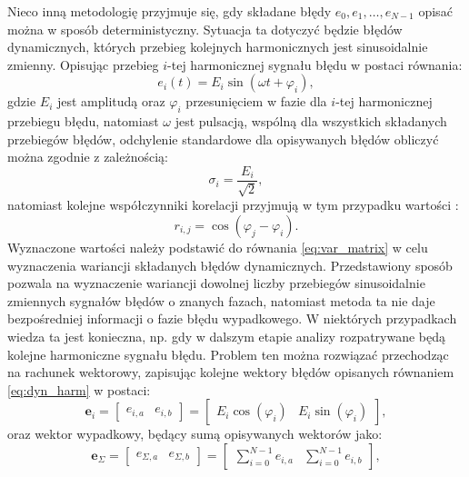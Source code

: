 Nieco inną metodologię przyjmuje się, gdy składane błędy $e_{0}, e_{1}, \hdots, e_{N-1}$ opisać można w sposób deterministyczny. Sytuacja ta dotyczyć będzie błędów dynamicznych, których przebieg kolejnych harmonicznych jest sinusoidalnie zmienny. Opisując przebieg $i$-tej harmonicznej sygnału błędu w postaci równania:
\begin{equation}
e_{i} \left( t \right) = E_{i} \sin \left( \omega t + \varphi_{i} \right) \label{eq:dyn_harm},
\end{equation}
gdzie $E_{i}$ jest amplitudą oraz $\varphi_{i}$ przesunięciem w fazie dla $i$-tej harmonicznej przebiegu błędu, natomiast $\omega$ jest pulsacją, wspólną dla wszystkich składanych przebiegów błędów, odchylenie standardowe dla opisywanych błędów obliczyć można zgodnie z zależnością:
\begin{equation}
\sigma_{i} = \frac{E_{i}}{\sqrt{2}} \label{eq:dyn_std},
\end{equation}
natomiast kolejne współczynniki korelacji przyjmują w tym przypadku wartości \cite{jakubiec_system}:
\begin{equation}
r_{i,j} = \cos \left( \varphi_{j} - \varphi_{i} \right) \label{eq:dyn_corr}.
\end{equation}
Wyznaczone wartości należy podstawić do równania \eqref{eq:var_matrix} w celu wyznaczenia wariancji składanych błędów dynamicznych. Przedstawiony sposób pozwala na wyznaczenie wariancji dowolnej liczby przebiegów sinusoidalnie zmiennych sygnałów błędów o znanych fazach, natomiast metoda ta nie daje bezpośredniej informacji o fazie błędu wypadkowego. W niektórych przypadkach wiedza ta jest konieczna, np. gdy w dalszym etapie analizy rozpatrywane będą kolejne harmoniczne sygnału błędu. Problem ten można rozwiązać przechodząc na rachunek wektorowy, zapisując kolejne wektory błędów opisanych równaniem \eqref{eq:dyn_harm} w postaci:
\begin{equation}
\mathbf{e}_{i} =
\begin{bmatrix}
e_{i,a} & e_{i,b}
\end{bmatrix}
=
\begin{bmatrix}
E_{i} \cos \left( \varphi_{i} \right) & E_{i} \sin \left( \varphi_{i} \right)
\end{bmatrix}
\label{eq:dyn_vect},
\end{equation}
oraz wektor wypadkowy, będący sumą opisywanych wektorów jako:
\begin{equation}
\mathbf{e}_{\Sigma} =
\begin{bmatrix}
e_{\Sigma,a} & e_{\Sigma,b}
\end{bmatrix}
=
\begin{bmatrix}
\sum _{i = 0} ^{N-1} e_{i,a} & \sum _{i = 0} ^{N-1} e_{i,b}
\end{bmatrix}
\label{eq:dyn_vect_sum},
\end{equation}
